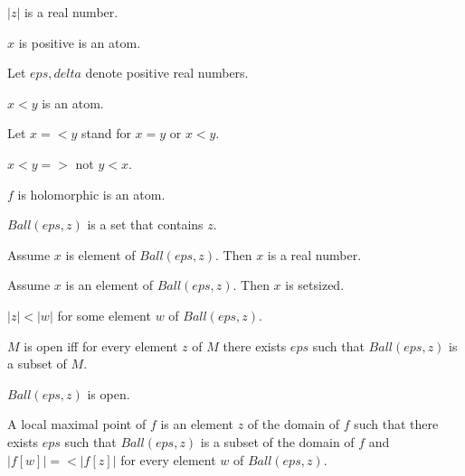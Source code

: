 \documentclass{document}
\begin{document}
\begin{forthel}
    \begin{signature}
      $|z|$ is a real number.
    \end{signature}

    \begin{signature}
      $x$ is positive is an atom.
    \end{signature}

    Let $eps, delta$ denote positive real numbers.

    \begin{signature}
      $x < y$ is an atom.
    \end{signature}

    Let $x =< y$ stand for $x = y$ or $x < y$.

    \begin{axiom}
      $x < y =>$ not $y < x$.
    \end{axiom}

    \begin{signature}
      $f$ is holomorphic is an atom.
    \end{signature}

    \begin{signature}
      $Ball(eps,z)$ is a set that contains $z$.
    \end{signature}

    \begin{axiom}
      Assume $x$ is element of $Ball(eps, z)$. Then $x$ is a real number.
    \end{axiom}
    
    \begin{lemma}
      Assume $x$ is an element of $Ball(eps, z)$. Then $x$ is setsized.
    \end{lemma}

    \begin{axiom}
      $|z| < |w|$ for some element $w$ of $Ball(eps,z)$.
    \end{axiom}

    \begin{definition}
      $M$ is open iff for every element $z$ of $M$ there exists $eps$ such that $Ball(eps,z)$ is a subset of $M$.
    \end{definition}

    \begin{axiom}
      $Ball(eps,z)$ is open.
    \end{axiom}

    \begin{definition}
      A local maximal point of $f$ is an element $z$ of the domain of $f$ such that there exists $eps$ such that $Ball(eps,z)$ is a subset of the domain of $f$ and $|f[w]| =< |f[z]|$ for every element $w$ of $Ball(eps,z)$.
    \end{definition}


\end{forthel}
\end{document}

